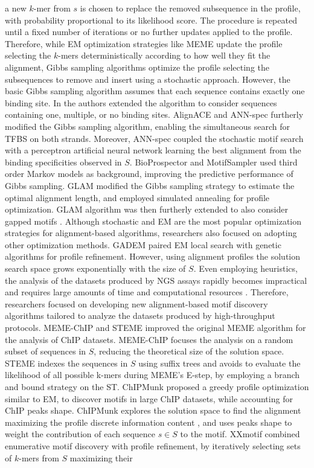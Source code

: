 \documentclass[a4paper, titlepage, 8pt, openright]{book}
\begin{document}
a new $k$-mer from $s$ is chosen to replace the removed subsequence in the profile, with probability proportional to its likelihood score. The procedure is repeated until a fixed number of iterations or no further updates applied to the profile. Therefore, while EM optimization strategies like MEME update the profile selecting the $k$-mers deterministically according to how well they fit the alignment, Gibbs sampling algorithms optimize the profile selecting the subsequences to remove and insert using a stochastic approach. However, the basic Gibbs sampling algorithm assumes that each sequence contains exactly one binding site. In \citep{neuwald1995gibbs} the authors extended the algorithm to consider sequences containing one, multiple, or no binding sites. AlignACE \citep{hughes2000computational} and ANN-spec \citep{workman1999ann} furtherly modified the Gibbs sampling algorithm, enabling the simultaneous search for TFBS on both strands. Moreover, ANN-spec coupled the stochastic motif search with a perceptron artificial neural network learning the best alignment from the binding specificities observed in $S$. BioProspector \citep{liu2000bioprospector} and MotifSampler \citep{thijs2001higher} used third order Markov models as background, improving the predictive performance of Gibbs sampling. GLAM \citep{frith2004finding} modified the Gibbs sampling strategy to estimate the optimal alignment length, and employed simulated annealing for profile optimization. GLAM algorithm was then furtherly extended to also consider gapped motifs \citep{frith2008discovering}. Although stochastic and EM are the most popular optimization strategies for alignment-based algorithms, researchers also focused on adopting other optimization methods. GADEM \citep{li2009gadem} paired EM local search with genetic algorithms for profile refinement. However, using alignment profiles the solution search space grows exponentially with the size of $S$. Even employing heuristics, the analysis of the datasets produced by NGS assays rapidly becomes impractical and requires large amounts of time and computational resources \citep{zambelli2013motif}. Therefore, researchers focused on developing new alignment-based motif discovery algorithms tailored to analyze the datasets produced by high-throughput protocols. MEME-ChIP \citep{machanick2011meme} and STEME \citep{reid2011steme} improved the original MEME algorithm for the analysis of ChIP datasets. MEME-ChIP focuses the analysis on a random subset of sequences in $S$, reducing the theoretical size of the solution space. STEME indexes the sequences in $S$ using suffix trees and avoids to evaluate the likelihood of all possible k-mers during MEME’s E-step, by employing a branch and bound strategy on the ST. ChIPMunk \citep{kulakovskiy2010deep} proposed a greedy profile optimization similar to EM, to discover motifs in large ChIP datasets, while accounting for ChIP peaks shape. ChIPMunk explores the solution space to find the alignment maximizing the profile discrete information content \citep{kulakovskiy2009discovery}, and uses peaks shape to weight the contribution of each sequence $s \in S$ to the motif. XXmotif \citep{hartmann2013p} combined enumerative motif discovery with profile refinement, by iteratively selecting sets of $k$-mers from $S$ maximizing their 
\end{document}

